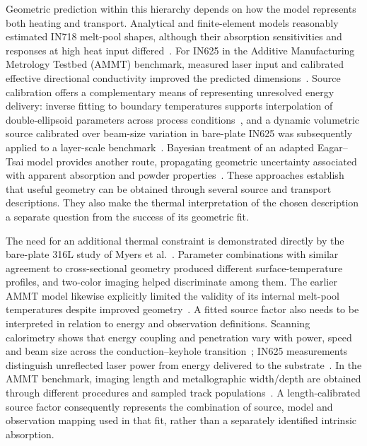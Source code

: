 Geometric prediction within this hierarchy depends on how the model represents both heating and transport. Analytical and finite-element models reasonably estimated IN718 melt-pool shapes, although their absorption sensitivities and responses at high heat input differed~\cite{promoppatum2017}. For IN625 in the Additive Manufacturing Metrology Testbed (AMMT) benchmark, measured laser input and calibrated effective directional conductivity improved the predicted dimensions~\cite{kollmannsberger2019}. Source calibration offers a complementary means of representing unresolved energy delivery: inverse fitting to boundary temperatures supports interpolation of double-ellipsoid parameters across process conditions~\cite{ross2022}, and a dynamic volumetric source calibrated over beam-size variation in bare-plate IN625 was subsequently applied to a layer-scale benchmark~\cite{dynamic2024}. Bayesian treatment of an adapted Eagar--Tsai model provides another route, propagating geometric uncertainty associated with apparent absorption and powder properties~\cite{whalen2021}. These approaches establish that useful geometry can be obtained through several source and transport descriptions. They also make the thermal interpretation of the chosen description a separate question from the success of its geometric fit.

The need for an additional thermal constraint is demonstrated directly by the bare-plate 316L study of Myers et al.~\cite{myers2023}. Parameter combinations with similar agreement to cross-sectional geometry produced different surface-temperature profiles, and two-color imaging helped discriminate among them. The earlier AMMT model likewise explicitly limited the validity of its internal melt-pool temperatures despite improved geometry~\cite{kollmannsberger2019}. A fitted source factor also needs to be interpreted in relation to energy and observation definitions. Scanning calorimetry shows that energy coupling and penetration vary with power, speed and beam size across the conduction--keyhole transition~\cite{ye2019}; IN625 measurements distinguish unreflected laser power from energy delivered to the substrate~\cite{lane2020absorption}. In the AMMT benchmark, imaging length and metallographic width/depth are obtained through different procedures and sampled track populations~\cite{lane2020}. A length-calibrated source factor consequently represents the combination of source, model and observation mapping used in that fit, rather than a separately identified intrinsic absorption.

